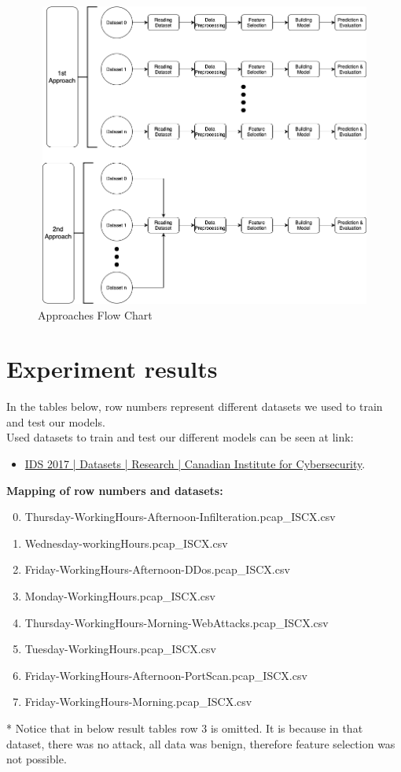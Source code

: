 \documentclass[submission,copyright,creativecommons]{eptcs}
\begin{document}
\begin{figure}[h]
\centerline{\includegraphics[height=10cm,width=15cm]{approaches.png}}
\caption{Approaches Flow Chart}
\end{figure}

\section{Experiment results}
In the tables below, row numbers represent different datasets we used to train and test our models.\\
Used datasets to train and test our different models can be seen at link: \\
\begin{itemize}
    \item \href{https://www.unb.ca/cic/datasets/ids-2017.html}{IDS 2017 | Datasets | Research | Canadian Institute for Cybersecurity}.\\
\end{itemize}
\textbf{Mapping of row numbers and datasets:}
\begin{enumerate}
\setcounter{enumi}{-1}
    \item Thursday-WorkingHours-Afternoon-Infilteration.pcap\_ISCX.csv
    \item Wednesday-workingHours.pcap\_ISCX.csv
    \item Friday-WorkingHours-Afternoon-DDos.pcap\_ISCX.csv
    \item Monday-WorkingHours.pcap\_ISCX.csv
    \item Thursday-WorkingHours-Morning-WebAttacks.pcap\_ISCX.csv
    \item Tuesday-WorkingHours.pcap\_ISCX.csv
    \item Friday-WorkingHours-Afternoon-PortScan.pcap\_ISCX.csv
    \item Friday-WorkingHours-Morning.pcap\_ISCX.csv

\end{enumerate}
* Notice that in below result tables row 3 is omitted. It is because in that dataset, there was no attack, all data was benign, therefore feature selection was not possible.\\
\end{document}
